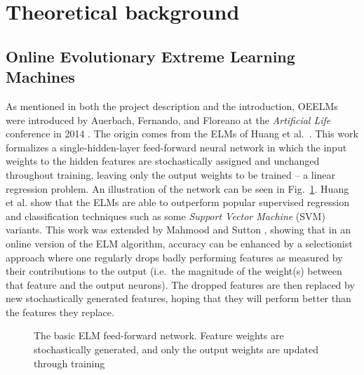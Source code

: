\documentclass[a4paper]{article}
\numberwithin{equation}{section}
\begin{document}
\section{Theoretical background}

\subsection{Online Evolutionary Extreme Learning Machines}
As mentioned in both the project description and the introduction, OEELMs were
introduced by Auerbach, Fernando, and Floreano at the \emph{Artificial Life}
conference in 2014 \cite{auerbach2014online}. The origin comes from the ELMs of
Huang et al.\ \cite{huang2012extreme}. This work formalizes a
single-hidden-layer feed-forward neural network in which the input weights to
the hidden features are stochastically assigned and unchanged throughout
training, leaving only the output weights to be trained -- a linear regression
problem. An illustration of the network can be seen in Fig.~\ref{fig:elm}.
Huang et al. show that the ELMs are able to outperform popular supervised
regression and classification techniques such as some \emph{Support Vector
Machine} (SVM) variants. This work was extended by Mahmood and Sutton
\cite{mahmood2013representation}, showing that in an online version of the ELM
algorithm, accuracy can be enhanced by a selectionist approach where one
regularly drops badly performing features as measured by their contributions to
the output (i.e.\ the magnitude of the weight(s) between that feature and the
output neurons). The dropped features are then replaced by new stochastically
generated features, hoping that they will perform better than the features they
replace.

\begin{figure}
    \centering
    
    \caption{The basic ELM feed-forward network. Feature weights are
    stochastically generated, and only the output weights are updated through
    training}
    \label{fig:elm}
\end{figure}
\end{document}
